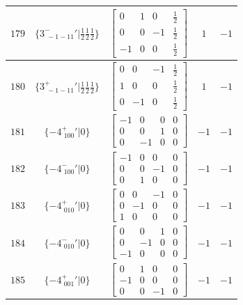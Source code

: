 \documentclass[fleqn,8pt]{jsarticle}
\begin{document}
\begin{longtable}{ccccc}
$ 179 $ & $ \{3^{-}_{\,\,-1-11}{}'|\frac{1}{2} \frac{1}{2} \frac{1}{2}\} $ & $ \begin{bmatrix} 0 & 1 & 0 & \frac{1}{2} \\ 0 & 0 & -1 & \frac{1}{2} \\ -1 & 0 & 0 & \frac{1}{2} \end{bmatrix} $ & $ 1 $ & $ -1 $ \\ \hline
$ 180 $ & $ \{3^{+}_{\,\,-1-11}{}'|\frac{1}{2} \frac{1}{2} \frac{1}{2}\} $ & $ \begin{bmatrix} 0 & 0 & -1 & \frac{1}{2} \\ 1 & 0 & 0 & \frac{1}{2} \\ 0 & -1 & 0 & \frac{1}{2} \end{bmatrix} $ & $ 1 $ & $ -1 $ \\ \hline
$ 181 $ & $ \{-4^{+}_{\,\,100}{}'|0\} $ & $ \begin{bmatrix} -1 & 0 & 0 & 0 \\ 0 & 0 & 1 & 0 \\ 0 & -1 & 0 & 0 \end{bmatrix} $ & $ -1 $ & $ -1 $ \\ \hline
$ 182 $ & $ \{-4^{-}_{\,\,100}{}'|0\} $ & $ \begin{bmatrix} -1 & 0 & 0 & 0 \\ 0 & 0 & -1 & 0 \\ 0 & 1 & 0 & 0 \end{bmatrix} $ & $ -1 $ & $ -1 $ \\ \hline
$ 183 $ & $ \{-4^{+}_{\,\,010}{}'|0\} $ & $ \begin{bmatrix} 0 & 0 & -1 & 0 \\ 0 & -1 & 0 & 0 \\ 1 & 0 & 0 & 0 \end{bmatrix} $ & $ -1 $ & $ -1 $ \\ \hline
$ 184 $ & $ \{-4^{-}_{\,\,010}{}'|0\} $ & $ \begin{bmatrix} 0 & 0 & 1 & 0 \\ 0 & -1 & 0 & 0 \\ -1 & 0 & 0 & 0 \end{bmatrix} $ & $ -1 $ & $ -1 $ \\ \hline
$ 185 $ & $ \{-4^{+}_{\,\,001}{}'|0\} $ & $ \begin{bmatrix} 0 & 1 & 0 & 0 \\ -1 & 0 & 0 & 0 \\ 0 & 0 & -1 & 0 \end{bmatrix} $ & $ -1 $ & $ -1 $ \\ \hline

\end{longtable}
\end{document}
